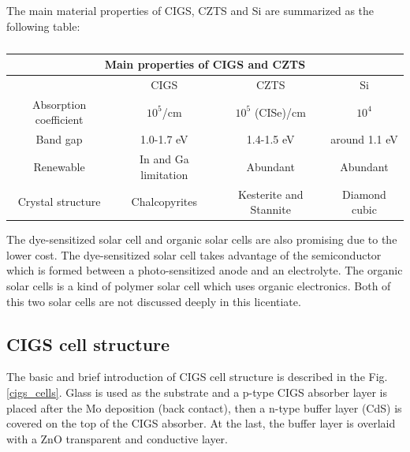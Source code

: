 \documentclass[a4paper, 12pt, titlepage,oneside,drop]{kthesis}
\begin{document}
The main material properties of CIGS, CZTS and Si are summarized as the following table:

\begin{table}[H]
\begin{center}
\begin{tabular}{|c|c|c|c|}
  \hline
  \multicolumn{4}{|c|}{Main properties of CIGS and CZTS} \\
  \hline
   $ $ & CIGS & CZTS & Si\\ \hline
   Absorption coefficient& $10^5$/cm & $10^5$ (CISe)/cm & $10^4$ \\ 
   Band gap& 1.0-1.7 eV & 1.4-1.5 eV & around 1.1 eV  \\ 
   Renewable& In and Ga limitation & Abundant & Abundant   \\ 
   Crystal structure& Chalcopyrites  & Kesterite and Stannite & Diamond cubic\\ 
  \hline
\end{tabular}
\caption{}
\end{center}
\end{table}



The dye-sensitized solar cell and organic solar cells are also promising due to the lower cost. The dye-sensitized solar cell takes advantage of the semiconductor which is formed between a photo-sensitized anode and an electrolyte.
The organic solar cells is a kind of polymer solar cell which uses organic electronics. Both of this two solar cells are not discussed deeply in this licentiate.


\subsection{CIGS cell structure}
The basic and brief introduction of CIGS cell structure is described in the Fig. \ref{cigs_cells}. Glass is used as the substrate and a p-type CIGS absorber layer is placed after 
the Mo deposition (back contact), then a n-type buffer layer (CdS) is covered on the top of the CIGS absorber.
At the last, the buffer layer is overlaid with a ZnO transparent and conductive layer.
\end{document}
